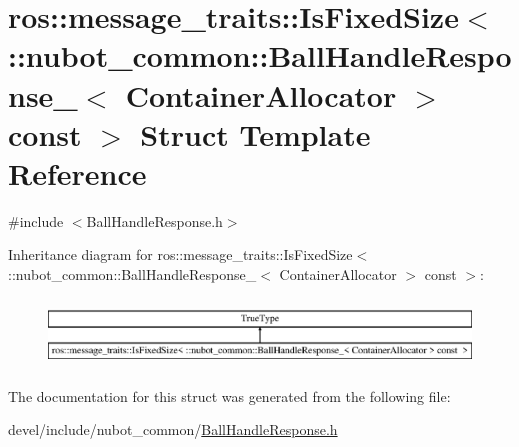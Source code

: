 \hypertarget{structros_1_1message__traits_1_1IsFixedSize_3_01_1_1nubot__common_1_1BallHandleResponse___3_01Co2f3ba6b6e4875ec3e45297fd9bffc5d1}{\section{ros\-:\-:message\-\_\-traits\-:\-:Is\-Fixed\-Size$<$ \-:\-:nubot\-\_\-common\-:\-:Ball\-Handle\-Response\-\_\-$<$ Container\-Allocator $>$ const $>$ Struct Template Reference}
\label{structros_1_1message__traits_1_1IsFixedSize_3_01_1_1nubot__common_1_1BallHandleResponse___3_01Co2f3ba6b6e4875ec3e45297fd9bffc5d1}
}


{\ttfamily \#include $<$Ball\-Handle\-Response.\-h$>$}

Inheritance diagram for ros\-:\-:message\-\_\-traits\-:\-:Is\-Fixed\-Size$<$ \-:\-:nubot\-\_\-common\-:\-:Ball\-Handle\-Response\-\_\-$<$ Container\-Allocator $>$ const $>$\-:\begin{figure}[H]
\begin{center}
\leavevmode
\includegraphics[height=1.836066cm]{structros_1_1message__traits_1_1IsFixedSize_3_01_1_1nubot__common_1_1BallHandleResponse___3_01Co2f3ba6b6e4875ec3e45297fd9bffc5d1}
\end{center}
\end{figure}


The documentation for this struct was generated from the following file\-:\begin{DoxyCompactItemize}
\item 
devel/include/nubot\-\_\-common/\hyperlink{BallHandleResponse_8h}{Ball\-Handle\-Response.\-h}\end{DoxyCompactItemize}
